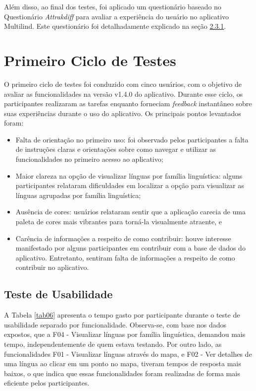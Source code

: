 Além disso, ao final dos testes, foi aplicado um questionário baseado no Questionário \textit{Attrakdiff} para avaliar a experiência do usuário no aplicativo Multilind. Este questionário foi detalhadamente explicado na seção \hyperref[sec:Medicao2]{2.3.1}.

\section{Primeiro Ciclo de Testes}
\label{sec:Primeiro Ciclo}
O primeiro ciclo de testes foi conduzido com cinco usuários, com o objetivo de avaliar as funcionalidades na versão v1.4.0 do aplicativo. Durante esse ciclo, os participantes realizaram as tarefas enquanto forneciam \textit{feedback} instantâneo sobre suas experiências durante o uso 
do aplicativo. Os principais pontos levantados foram:

\begin{itemize}
	\item Falta de orientação no primeiro uso: foi observado pelos participantes a falta de instruções claras e orientações sobre como navegar e utilizar as funcionalidades no primeiro acesso ao aplicativo;
	\item Maior clareza na opção de visualizar línguas por família linguística: alguns participantes relataram dificuldades em localizar a opção para visualizar as línguas agrupadas por família linguística;
	\item Ausência de cores: usuários relataram sentir que a aplicação carecia de uma paleta de cores mais vibrantes para torná-la visualmente atraente, e
	\item Carência de informações a respeito de como contribuir: houve interesse manifestado por alguns participantes em contribuir com a base de dados do aplicativo. Entretanto, sentiram falta de informações a respeito 
	de como contribuir no aplicativo.
\end{itemize}

\subsection{Teste de Usabilidade}
\label{sec:Primeiro Teste de Usabilidade}
A Tabela \ref{tab06} apresenta o tempo gasto por participante durante o teste de usabilidade separado por funcionalidade. Observa-se, com base nos dados expostos, que a F04 - Visualizar línguas por família linguística, 
demandou mais tempo, independentemente de quem estava testando. Por outro lado, as funcionalidades F01 - Visualizar línguas através do mapa, e F02 - Ver detalhes de uma língua ao clicar em um ponto no mapa, tiveram tempos 
de resposta mais baixos, o que indica que essas funcionalidades foram realizadas de forma mais eficiente pelos participantes.

